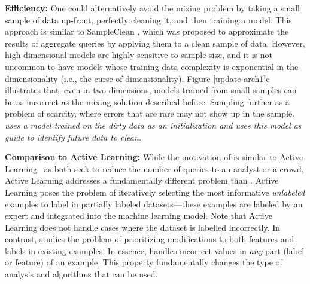 \vspace{0.5em}
\noindent \textbf{Efficiency: } One could alternatively avoid the mixing problem by taking a small sample of data up-front, perfectly cleaning it, and then training a model.
This approach is similar to SampleClean \cite{wang1999sample}, which was proposed to approximate the results of aggregate queries by applying them to a clean sample of data.
However, high-dimensional models are highly sensitive to sample size, and it is not uncommon to have models whose training data complexity is exponential in the dimensionality (i.e., the curse of dimensionality).
Figure \ref{update-arch1}c illustrates that, even in two dimensions, models trained from small samples can be as incorrect as the mixing solution described before.
Sampling further as a problem of scarcity, where errors that are rare may not show up in the sample.
\emph{\sys uses a model trained on the dirty data as an initialization and uses this model as guide to identify future data to clean.}

\vspace{0.5em}
\noindent \textbf{Comparison to Active Learning: } While the motivation of \sys is similar to Active Learning~\cite{DBLP:journals/pvldb/YakoutENOI11,gokhale2014corleone} as both seek to reduce the number of queries to an analyst or a crowd, Active Learning addresses a fundamentally different problem than \sys.
Active Learning poses the problem of iteratively selecting the most informative {\it unlabeled} examples to label in partially labeled datasets---these
examples are labeled by an expert and integrated into the machine learning model.
Note that Active Learning does not handle cases where the dataset is labelled incorrectly.
In contrast, \sys studies the problem of prioritizing modifications to both features and labels in existing examples.
In essence, \sys handles incorrect values in {\it any} part (label or feature) of an example.
This property fundamentally changes the type of analysis and algorithms that can be used.





